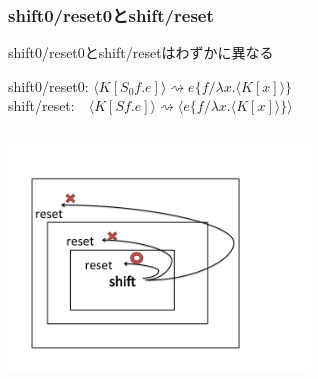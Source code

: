 \documentclass[dvipdfmx,cjk,xcolor=dvipsnames,envcountsect,notheorems,12pt]{beamer}
\theoremstyle{definition}
\begin{document}
\begin{frame}[fragile]
  \frametitle{shift0/reset0とshift/reset}


  shift0/reset0とshift/resetはわずかに異なる

  \begin{center}
    shift0/reset0: $\langle K [S_0 f.e] \rangle \rightsquigarrow e \{ f / \lambda x . \langle K [x] \rangle \}$\\
    shift/reset:  \,\,\,\,$\langle K [S f.e] \rangle \rightsquigarrow \langle e \{ f / \lambda x . \langle K [x] \rangle \} \rangle $
  \end{center}

  \begin{columns}
    \begin{column}{.5\textwidth}
      \includegraphics[clip,width=8cm]{./img/sr.png}
    \end{column}


\end{columns}
\end{frame}
\end{document}
